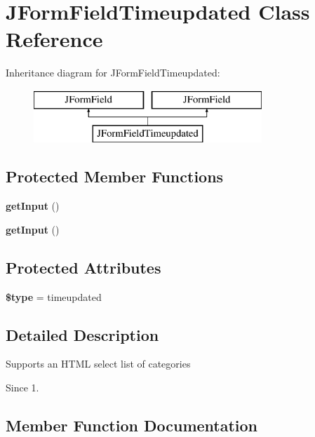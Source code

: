 \section{J\+Form\+Field\+Timeupdated Class Reference}
\label{class_j_form_field_timeupdated}
Inheritance diagram for J\+Form\+Field\+Timeupdated\+:\begin{figure}[H]
\begin{center}
\leavevmode
\includegraphics[height=2.000000cm]{class_j_form_field_timeupdated}
\end{center}
\end{figure}
\subsection*{Protected Member Functions}
\begin{DoxyCompactItemize}
\item 
\textbf{ get\+Input} ()
\item 
\textbf{ get\+Input} ()
\end{DoxyCompactItemize}
\subsection*{Protected Attributes}
\begin{DoxyCompactItemize}
\item 
\textbf{ \$type} = \textquotesingle{}timeupdated\textquotesingle{}
\end{DoxyCompactItemize}


\subsection{Detailed Description}
Supports an H\+T\+ML select list of categories

\begin{DoxySince}{Since}
1. 
\end{DoxySince}


\subsection{Member Function Documentation}
\mbox{\label{class_j_form_field_timeupdated_a4380f30ae9202fa49ebd2439572f9cdb}} 
